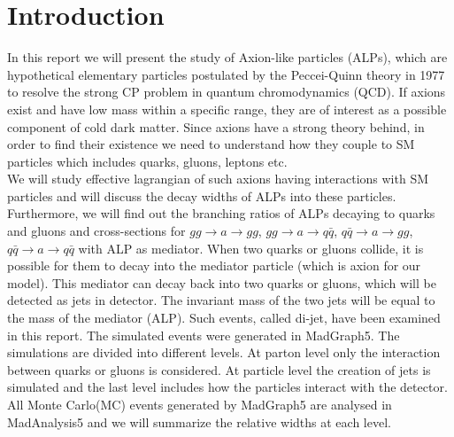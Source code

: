 \documentclass[12pt,a4paper]{article}
\begin{document}
\section{Introduction}
In this report we will present the study of Axion-like particles (ALPs), which are hypothetical elementary particles postulated by the Peccei-Quinn theory in 1977 to resolve the strong CP problem in quantum chromodynamics (QCD). If axions exist and have low mass within a specific range, they are of interest as a possible component of cold dark matter. 
Since axions have a strong theory behind, in order to find their existence we need to understand how they couple to SM particles which includes quarks, gluons, leptons etc. \\
We will study effective lagrangian of such axions having interactions with SM particles and will discuss the decay widths of ALPs into these particles. Furthermore, we will find out the branching ratios of ALPs decaying to quarks and gluons and cross-sections for $ g g \rightarrow a \rightarrow g g $, $g g \rightarrow  a \rightarrow q \bar{q}$, $q \bar{q} \rightarrow  a \rightarrow g g $, $q \bar{q} \rightarrow  a \rightarrow  q \bar{q}$ with ALP as mediator.
When two quarks or gluons collide, it is possible for them to decay into the mediator particle (which is axion for our model). This mediator can decay back into two quarks or gluons, which will be detected as jets in detector. The invariant mass of the two jets will be equal to the mass of the mediator (ALP). Such events, called di-jet, have been examined in this report. The simulated events were generated in MadGraph5. The simulations are divided into different levels. At parton level only the interaction between quarks or gluons is considered. At particle level the creation of jets is simulated and the last level includes how the particles interact with the detector. All Monte Carlo(MC) events generated by MadGraph5 are analysed in MadAnalysis5 and we will summarize the relative widths at each level.
\end{document}
